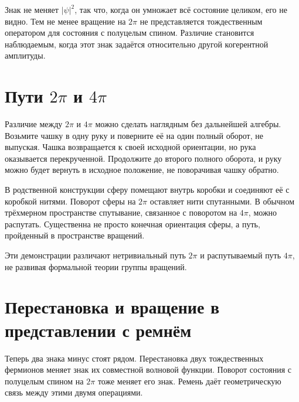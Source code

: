 Знак не меняет \(\lvert\psi\rvert^2\), так что, когда он умножает всё состояние целиком, его не видно. Тем не менее вращение на \(2\pi\) не представляется тождественным оператором для состояния с полуцелым спином. Различие становится наблюдаемым, когда этот знак задаётся относительно другой когерентной амплитуды.

\section{Пути \texorpdfstring{\(2\pi\) и \(4\pi\)}{2 pi и 4 pi}}

Различие между \(2\pi\) и \(4\pi\) можно сделать наглядным без дальнейшей алгебры. Возьмите чашку в одну руку и поверните её на один полный оборот, не выпуская. Чашка возвращается к своей исходной ориентации, но рука оказывается перекрученной. Продолжите до второго полного оборота, и руку можно будет вернуть в исходное положение, не поворачивая чашку обратно.

В родственной конструкции сферу помещают внутрь коробки и соединяют её с коробкой нитями. Поворот сферы на \(2\pi\) оставляет нити спутанными. В обычном трёхмерном пространстве спутывание, связанное с поворотом на \(4\pi\), можно распутать. Существенна не просто конечная ориентация сферы, а путь, пройденный в пространстве вращений.

\begin{classroomqa}
\end{classroomqa}

Эти демонстрации различают нетривиальный путь \(2\pi\) и распутываемый путь \(4\pi\), не развивая формальной теории группы вращений.

\section{Перестановка и вращение в представлении с ремнём}

Теперь два знака минус стоят рядом. Перестановка двух тождественных фермионов меняет знак их совместной волновой функции. Поворот состояния с полуцелым спином на \(2\pi\) тоже меняет его знак. Ремень даёт геометрическую связь между этими двумя операциями.

